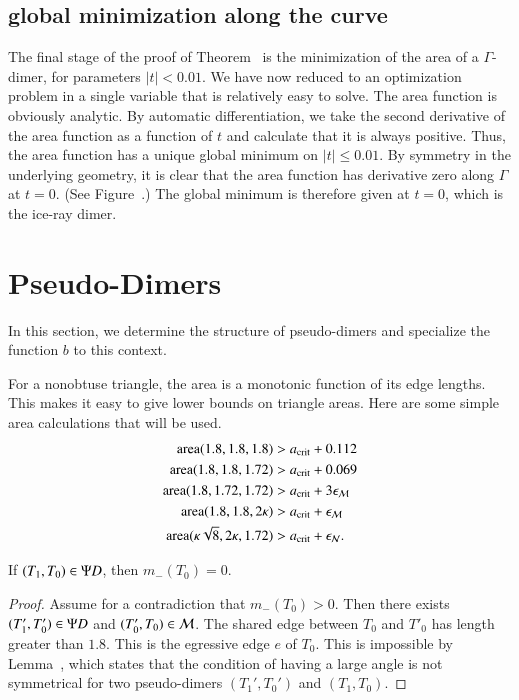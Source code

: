 \subsection{global minimization along the curve}

The final stage of the proof of Theorem~ is the
minimization of the area of a $\Gamma$-dimer, for parameters
$|t|<0.01$.  We have now reduced to an optimization problem in a
single variable that is relatively easy to solve.  The area function
is obviously analytic.  By automatic differentiation, we take the
second derivative of the area function as a function of $t$ and
calculate that it is always positive.  Thus, the area function has a
unique global minimum on $|t|\le 0.01$.  By symmetry in the underlying
geometry, it is clear that the area function has derivative zero along
$\Gamma$ at $t=0$.  (See Figure~.) The global
minimum is therefore given at $t=0$, which is the ice-ray dimer.

\section{Pseudo-Dimers}

In this section, we determine the structure of pseudo-dimers and
specialize the function $b$ to this context.

For a nonobtuse triangle, the area is a monotonic function of its edge
lengths.  This makes it easy to give lower bounds on triangle areas.
Here are some simple area calculations that will be used.
\begin{align*}
{\operatorname{area}}(1.8,1.8,1.8) &> a_\text{crit} + 0.112\\
{\operatorname{area}}(1.8,1.8,1.72) &> a_\text{crit} + 0.069\\
{\operatorname{area}}(1.8,1.72,1.72) &> a_\text{crit} + 3\epsilon_{\mathcal M}\\
{\operatorname{area}}(1.8,1.8,2\kappa) &> a_\text{crit} + \epsilon_{\mathcal M}\\
{\operatorname{area}}(\kappa\sqrt8,2\kappa,1.72) &> a_\text{crit} +\epsilon_{\mathcal N}.
\end{align*}

\begin{lemma}  
If $(T_1,T_0)\in\Psi D$, then $m_-(T_0)=0$.
\end{lemma}

\begin{proof} 
  Assume for a contradiction that $m_-(T_0)>0$.  Then there exists
  $(T'_1,T_0')\in\Psi D$ and $(T'_0,T_0)\in\mathcal M$.  The shared edge between
  $T_0$ and $T'_0$ has length greater than $1.8$.  This is the
  egressive edge $e$ of $T_0$.  This is impossible by
  Lemma~, which states that the condition of having a
  large angle is not symmetrical for two pseudo-dimers $(T_1',T_0')$
  and $(T_1,T_0)$.
\end{proof}

